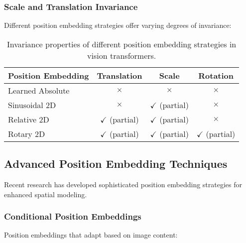 \subsubsection{Scale and Translation Invariance}

Different position embedding strategies offer varying degrees of invariance:

\begin{table}[htbp]
\centering
\begin{tabular}{lccc}
\toprule
\textbf{Position Embedding} & \textbf{Translation} & \textbf{Scale} & \textbf{Rotation} \\
\midrule
Learned Absolute & $\times$ & $\times$ & $\times$ \\
Sinusoidal 2D & $\times$ & $\checkmark$ (partial) & $\times$ \\
Relative 2D & $\checkmark$ (partial) & $\checkmark$ (partial) & $\times$ \\
Rotary 2D & $\checkmark$ (partial) & $\checkmark$ (partial) & $\checkmark$ (partial) \\
\bottomrule
\end{tabular}
\caption{Invariance properties of different position embedding strategies in vision transformers.}
\end{table}

\subsection{Advanced Position Embedding Techniques}

Recent research has developed sophisticated position embedding strategies for enhanced spatial modeling.

\subsubsection{Conditional Position Embeddings}

Position embeddings that adapt based on image content:

